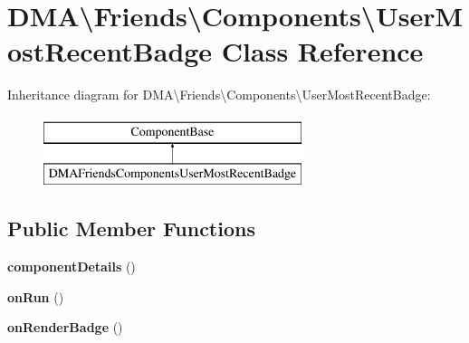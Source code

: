 \hypertarget{classDMA_1_1Friends_1_1Components_1_1UserMostRecentBadge}{}\section{D\+M\+A\textbackslash{}Friends\textbackslash{}Components\textbackslash{}User\+Most\+Recent\+Badge Class Reference}
\label{classDMA_1_1Friends_1_1Components_1_1UserMostRecentBadge}
Inheritance diagram for D\+M\+A\textbackslash{}Friends\textbackslash{}Components\textbackslash{}User\+Most\+Recent\+Badge\+:\begin{figure}[H]
\begin{center}
\leavevmode
\includegraphics[height=2.000000cm]{d7/d5f/classDMA_1_1Friends_1_1Components_1_1UserMostRecentBadge}
\end{center}
\end{figure}
\subsection*{Public Member Functions}
\begin{DoxyCompactItemize}
\item 
\hypertarget{classDMA_1_1Friends_1_1Components_1_1UserMostRecentBadge_af1a08876aa0dd5462363a71e4624e085}{}{\bfseries component\+Details} ()\label{classDMA_1_1Friends_1_1Components_1_1UserMostRecentBadge_af1a08876aa0dd5462363a71e4624e085}

\item 
\hypertarget{classDMA_1_1Friends_1_1Components_1_1UserMostRecentBadge_a8344e51d141173d907bf02bddec92635}{}{\bfseries on\+Run} ()\label{classDMA_1_1Friends_1_1Components_1_1UserMostRecentBadge_a8344e51d141173d907bf02bddec92635}

\item 
\hypertarget{classDMA_1_1Friends_1_1Components_1_1UserMostRecentBadge_a3a27b3649a629bf7b018d3f6e4513053}{}{\bfseries on\+Render\+Badge} ()\label{classDMA_1_1Friends_1_1Components_1_1UserMostRecentBadge_a3a27b3649a629bf7b018d3f6e4513053}

\end{DoxyCompactItemize}
